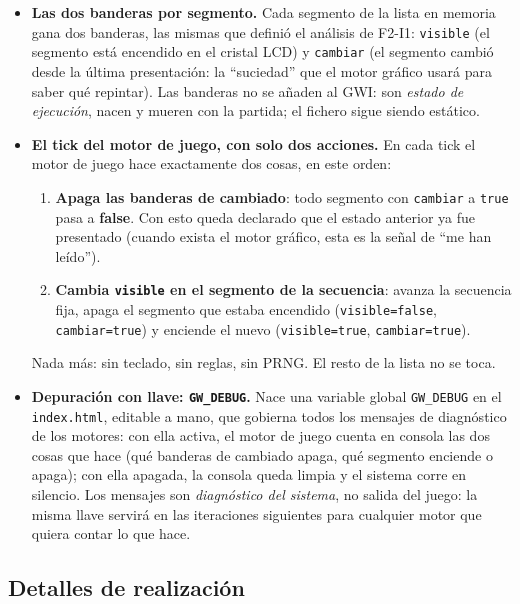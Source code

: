 \begin{itemize}
	\item \textbf{Las dos banderas por segmento.} Cada segmento de la lista en memoria
	gana dos banderas, las mismas que definió el análisis de F2-I1:
	\texttt{visible} (el segmento está encendido en el cristal LCD) y
	\texttt{cambiar} (el segmento cambió desde la última presentación: la ``suciedad''
	que el motor gráfico usará para saber qué repintar). Las banderas no se añaden al
	GWI: son \emph{estado de ejecución}, nacen y mueren con la partida; el fichero sigue
	siendo estático.
	\item \textbf{El tick del motor de juego, con solo dos acciones.} En cada tick el
	motor de juego hace exactamente dos cosas, en este orden:
	\begin{enumerate}
		\item \textbf{Apaga las banderas de cambiado}: todo segmento con
		\texttt{cambiar} a \texttt{true} pasa a \textbf{false}. Con esto queda
		declarado que el estado anterior ya fue presentado (cuando exista el motor
		gráfico, esta es la señal de ``me han leído'').
		\item \textbf{Cambia \texttt{visible} en el segmento de la secuencia}: avanza
		la secuencia fija, apaga el segmento que estaba encendido
		(\texttt{visible=false}, \texttt{cambiar=true}) y enciende el nuevo
		(\texttt{visible=true}, \texttt{cambiar=true}).
	\end{enumerate}
	Nada más: sin teclado, sin reglas, sin PRNG. El resto de la lista no se toca.
	\item \textbf{Depuración con llave: \texttt{GW\_DEBUG}.} Nace una variable global
	\texttt{GW\_DEBUG} en el \texttt{index.html}, editable a mano, que gobierna todos
	los mensajes de diagnóstico de los motores: con ella activa, el motor de juego
	cuenta en consola las dos cosas que hace (qué banderas de cambiado apaga, qué
	segmento enciende o apaga); con ella apagada, la consola queda limpia y el
	sistema corre en silencio. Los mensajes son \emph{diagnóstico del sistema}, no
	salida del juego: la misma llave servirá en las iteraciones siguientes para
	cualquier motor que quiera contar lo que hace.
\end{itemize}

\subsection{Detalles de realización}
\label{subsec:DetallesF2I3}

